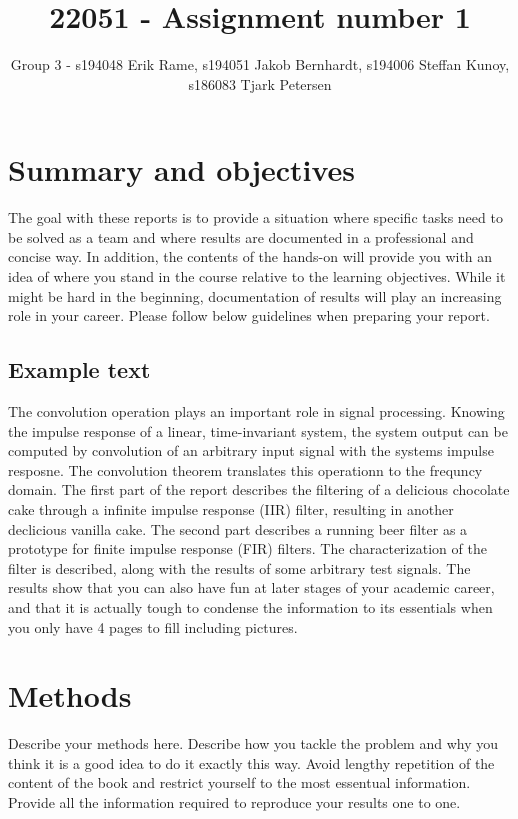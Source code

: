 \documentclass[journal]{IEEEtran}
\begin{document}
\title{22051 - Assignment number 1}
\author{Group 3 - s194048 Erik Rame, s194051 Jakob Bernhardt, s194006 Steffan Kunoy, s186083 Tjark Petersen}


\maketitle


\section{Summary and objectives}
The goal with these reports is to provide a situation where specific tasks need to be solved as a team and where results are documented in a professional and concise way. In addition, the contents of the hands-on will provide you with an idea of where you stand in the course relative to the learning objectives. While it might be hard in the beginning, documentation of results will play an increasing role in your career. Please follow below guidelines when preparing your report.

\subsection{Example text} 
The convolution operation plays an important role in signal processing. Knowing the impulse response of a linear, time-invariant system, the system output can be computed by convolution of an arbitrary input signal with the systems impulse resposne. The convolution theorem translates this operationn to the frequncy domain.
The first part of the report describes the filtering of a delicious chocolate cake through a infinite impulse response (IIR) filter, resulting in another declicious vanilla cake. The second part describes a running beer filter as a prototype for finite impulse response (FIR) filters. The characterization of the filter is described, along with the results of some arbitrary test signals.
The results show that you can also have fun at later stages of your academic career, and that it is actually tough to condense the information to its essentials when you only have 4 pages to fill including pictures.

\section{Methods}
Describe your methods here. Describe how you tackle the problem and why you think it is a good idea to do it exactly this way. Avoid lengthy repetition of the content of the book and restrict yourself to the most essentual information. Provide all the information required to reproduce your results one to one.
\end{document}
